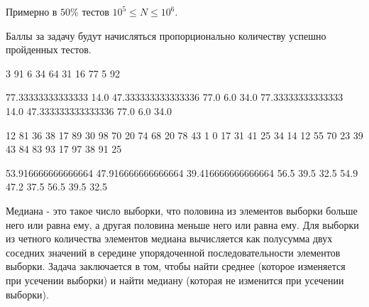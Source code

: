 Примерно в $ 50\% $ тестов $ 10^5 \leq N \leq 10^6$.

Баллы за задачу будут начисляться пропорционально количеству успешно пройденных тестов.


\begin{myverbbox}[\small]{\vinput}
    3
    91 6 34
    64 31 16
    77 5 92
\end{myverbbox}

\begin{myverbbox}[\small]{\voutput}
    77.33333333333333 14.0 47.333333333333336
    77.0 6.0 34.0
    77.33333333333333 14.0 47.333333333333336
    77.0 6.0 34.0
\end{myverbbox}


\begin{myverbbox}[\small]{\vinput}
    12
    81 36 38
    17 89 30
    98 70 20
    74 68 20
    78 43 1
    0 17 31
    41 25 34
    14 12 55
    70 23 39
    43 84 83
    93 17 97
    38 91 25
\end{myverbbox}

\begin{myverbbox}[\small]{\voutput}
    53.916666666666664 47.916666666666664 39.416666666666664
    56.5 39.5 32.5
    54.9 47.2 37.5
    56.5 39.5 32.5
\end{myverbbox}




\solutionSection
Медиана - это такое число выборки, что половина из элементов выборки больше него или равна ему, а другая половина меньше него или равна ему. Для выборки из четного количества элементов медиана вычисляется как полусумма двух соседних значений в середине упорядоченной последовательности элементов выборки. Задача заключается в том, чтобы найти среднее (которое изменяется при усечении выборки) и найти медиану (которая не изменится при усечении выборки).

